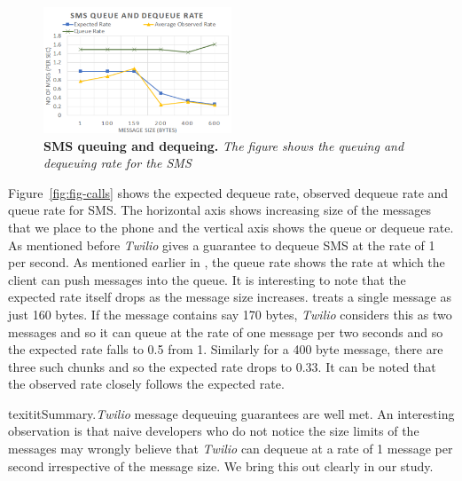 \begin{figure}[h!] \centering
\includegraphics[width=0.5\textwidth]{graphs/sms.pdf}
\caption{\label{fig-calls}\textbf{SMS queuing and dequeing.} {\footnotesize\textit{
The figure shows the queuing and dequeuing rate for the SMS
}}}
\end{figure}

Figure~\ref{fig:fig-calls} shows the expected dequeue rate, observed dequeue rate and queue rate for SMS. The horizontal axis shows increasing size of the messages that we place to the phone and the vertical axis shows the queue or dequeue rate. As mentioned before \textit{Twilio} gives a guarantee to dequeue SMS at the rate of 1 per second. As mentioned earlier in , the queue rate shows the rate at which the client can push messages into the queue. It is interesting to note that the expected rate itself drops as the message size increases.  treats a single message as just 160 bytes. If the message contains say 170 bytes, \textit{Twilio} considers this as two messages and so it can queue at the rate of one message per two seconds and so the expected rate falls to 0.5 from 1. Similarly for a 400 byte message, there are three such chunks and so the expected rate drops to 0.33. It can be noted that the observed rate closely follows the expected rate. 

{texitit}Summary.\textit{Twilio} message dequeuing guarantees are well met. An interesting observation is that naive developers who do not notice the size limits of the messages may wrongly believe that \textit{Twilio} can dequeue at a rate of 1 message per second irrespective of the message size. We bring this out clearly in our study. 


